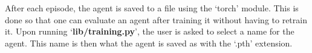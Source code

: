 \documentclass[
	a4paper, %
	10pt, %
	unnumberedsections, %
	twoside, %
]{LTJournalArticle}
\begin{document}
After each episode, the agent is saved to a file using the `torch' module. This is done so that one can evaluate an agent after training it without having to retrain it. Upon running `\textbf{lib/training.py}',
the user is asked to select a name for the agent. This name is then what the agent is saved as with the `.pth' extension.
\end{document}
